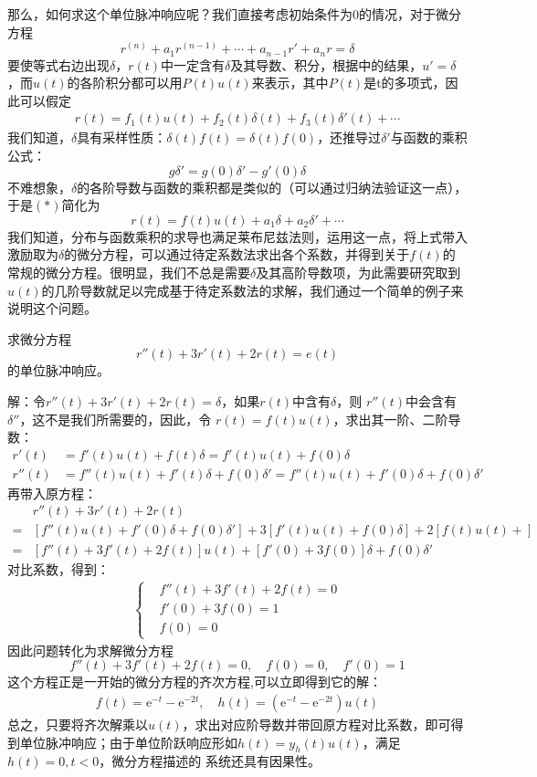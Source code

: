 那么，如何求这个单位脉冲响应呢？我们直接考虑初始条件为0的情况，对于微分方程
\[r^{(n)}+a_{1}r^{(n-1)}+\cdots +a_{n-1} r'+a_n r=\delta\]
要使等式右边出现$\delta$，$r(t)$中一定含有$\delta$及其导数、积分，根据中的结果，$u'=\delta$，而$u(t)$的各阶积分都可以用$P(t)u(t)$来表示，其中$P(t)$是t的多项式，因此可以假定
\begin{align*}
    r(t)=f_1(t)u(t)+f_2(t)\delta(t)+f_3(t)\delta'(t)+\cdots\tag{$*$}
\end{align*}
我们知道，$\delta$具有采样性质：$\delta(t)f(t)=\delta(t)f(0)$，还推导过$\delta'$与函数的乘积公式：
$$g\delta'=g(0)\delta'-g'(0)\delta$$
不难想象，$\delta$的各阶导数与函数的乘积都是类似的（可以通过归纳法验证这一点），于是$(*)$简化为
\[r(t)=f(t)u(t)+a_1\delta+a_2\delta'+\cdots\]
我们知道，分布与函数乘积的求导也满足莱布尼兹法则，运用这一点，将上式带入激励取为$\delta$的微分方程，可以通过待定系数法求出各个系数，并得到关于$f(t)$的常规的微分方程。很明显，我们不总是需要$\delta$及其高阶导数项，为此需要研究取到$u(t)$的几阶导数就足以完成基于待定系数法的求解，我们通过一个简单的例子来说明这个问题。

\begin{example}
    求微分方程
\[r''(t)+3r'(t)+2r(t)=e(t)\]
的单位脉冲响应。

解：令$r''(t)+3r'(t)+2r(t)=\delta$，如果$r(t)$中含有$\delta$，则
$r''(t)$中会含有$\delta''$，这不是我们所需要的，因此，令
$r(t)=f(t)u(t)$，求出其一阶、二阶导数：\begin{align*}
    r'(t)&=f'(t)u(t)+f(t)\delta=f'(t)u(t)+f(0)\delta\\
    r''(t)&=f''(t)u(t)+f'(t)\delta+f(0)\delta'=f''(t)u(t)+f'(0)\delta+f(0)\delta'
\end{align*}
再带入原方程：\begin{align*}
    &r''(t)+3r'(t)+2r(t)\\
    =&\left[f''(t)u(t)+f'(0)\delta+f(0)\delta'\right]+3\left[f'(t)u(t)+f(0)\delta\right]+2\left[f(t)u(t)+\right]\\
    =&\left[f''(t)+3f'(t)+2f(t)\right]u(t)+\left[f'(0)+3f(0)\right]\delta+f(0)\delta'
\end{align*}
对比系数，得到：\begin{align*}\begin{cases}
    &f''(t)+3f'(t)+2f(t)=0\\
    &f'(0)+3f(0)=1\\
    &f(0)=0
\end{cases}
\end{align*}
因此问题转化为求解微分方程
\[f''(t)+3f'(t)+2f(t)=0,\quad f(0)=0,\quad f'(0)=1\]
这个方程正是一开始的微分方程的齐次方程,可以立即得到它的解：
\begin{align*}
    f(t)=\mathrm{e}^{-t}-\mathrm{e}^{-2t},\quad h(t)=\left(\mathrm{e}^{-t}-\mathrm{e}^{-2t}\right)u(t)
\end{align*}
总之，只要将齐次解乘以$u(t)$，求出对应阶导数并带回原方程对比系数，即可得到单位脉冲响应；由于单位阶跃响应形如$h(t)=y_h(t)u(t)$，满足$h(t)=0,t<0$，微分方程描述的
系统还具有因果性。
\end{example}

